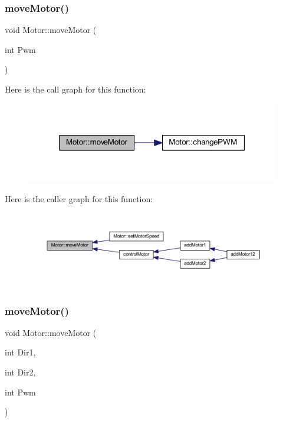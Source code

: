 \subsubsection{\texorpdfstring{move\+Motor()}{moveMotor()}\hspace{0.1cm}{\footnotesize\ttfamily [1/2]}}
{\footnotesize\ttfamily void Motor\+::move\+Motor (\begin{DoxyParamCaption}\item[{int}]{Pwm }\end{DoxyParamCaption})}

Here is the call graph for this function\+:
\nopagebreak
\begin{figure}[H]
\begin{center}
\leavevmode
\includegraphics[width=315pt]{d1/d6b/class_motor_a81fada8275a8cd70805a9808314e7bee_cgraph}
\end{center}
\end{figure}
Here is the caller graph for this function\+:
\nopagebreak
\begin{figure}[H]
\begin{center}
\leavevmode
\includegraphics[width=350pt]{d1/d6b/class_motor_a81fada8275a8cd70805a9808314e7bee_icgraph}
\end{center}
\end{figure}
\mbox{\label{class_motor_a06b855952ba7034f260063b6d94c4b3a}} 
\subsubsection{\texorpdfstring{move\+Motor()}{moveMotor()}\hspace{0.1cm}{\footnotesize\ttfamily [2/2]}}
{\footnotesize\ttfamily void Motor\+::move\+Motor (\begin{DoxyParamCaption}\item[{int}]{Dir1,  }\item[{int}]{Dir2,  }\item[{int}]{Pwm }\end{DoxyParamCaption})}

